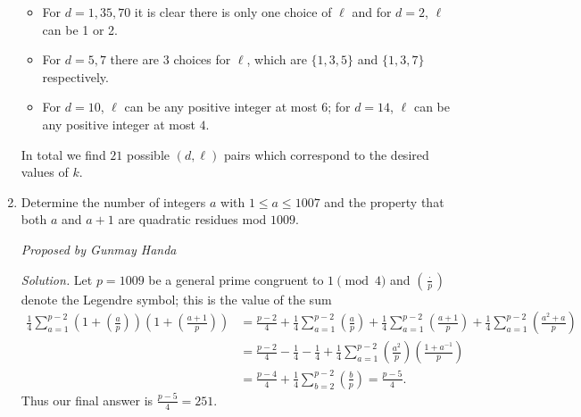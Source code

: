 \documentclass[10pt]{article}
\newcommand{\proposed}[1]
{
\vspace{3pt}
\noindent\textit{Proposed by #1}
}
\newcommand{\solution}
{
\vspace{3pt}
\noindent\textit{Solution.}\qquad
}
\begin{document}
\begin{enumerate}
\begin{itemize}
\item For $d = 1, 35, 70$ it is clear there is only one choice of $\ell$ and for $d = 2$, $\ell$ can be 1 or 2.

\item For $d = 5,7$ there are 3 choices for $\ell$, which are $\{1, 3, 5\}$ and $\{1, 3, 7\}$ respectively.
		
\item For $d = 10$, $\ell$ can be any positive integer at most $6$; for $d = 14$, $\ell$ can be any positive integer at most $4$.
\end{itemize}
		
In total we find $\boxed{21}$ possible $(d,\ell)$ pairs which correspond to the desired values of $k$.

\item Determine the number of integers $a$ with $1\leq a\leq 1007$ and the property that both $a$ and $a+1$ are quadratic residues mod $1009$.

\proposed{Gunmay Handa}

\solution Let $p=1009$ be a general prime congruent to $1 \pmod 4$ and $(\frac{\cdot}{p})$ denote the Legendre symbol; this is the value of the sum 
\begin{align*}
\frac{1}{4}\sum_{a=1}^{p-2}\left(1+\left(\frac{a}{p}\right)\right)\left(1+\left(\frac{a+1}{p}\right)\right)&=\frac{p-2}{4}+\frac{1}{4}\sum_{a=1}^{p-2}\left(\frac{a}{p}\right)+\frac{1}{4}\sum_{a=1}^{p-2}\left(\frac{a+1}{p}\right)+\frac{1}{4}\sum_{a=1}^{p-2}\left(\frac{a^2+a}{p}\right)\\
&=\frac{p-2}{4}-\frac{1}{4}-\frac{1}{4}+\frac{1}{4}\sum_{a=1}^{p-2}\left(\frac{a^2}{p}\right)\left(\frac{1+a^{-1}}{p}\right)\\
&=\frac{p-4}{4}+\frac{1}{4}\sum_{b=2}^{p-2}\left(\frac{b}{p}\right)=\frac{p-5}{4}.
\end{align*}
Thus our final answer is $\frac{p-5}{4}=\boxed{251}.$
\end{enumerate}
\end{document}
